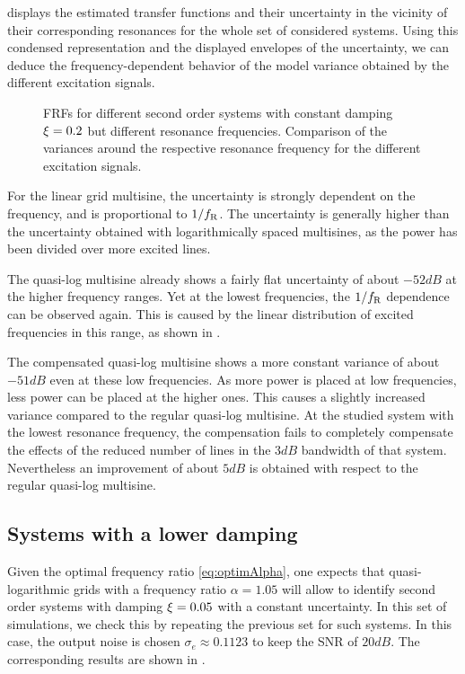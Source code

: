    displays the estimated transfer functions and their uncertainty in the vicinity of their corresponding resonances for the whole set of considered systems.
  Using this condensed representation and the displayed envelopes of the uncertainty, we can deduce the frequency-dependent behavior of the model variance obtained by the different excitation signals.

  \begin{figure}%
    \centering
      \setlength{}
      \setlength\figureheight{0.68\figurewidth}
    
    \caption[Simulated FRFs and their variances of systems with $\damping=0.2$ for different excitation signals.]{\glspl{FRF} for different second order systems with constant damping
             $\damping=0.2$ but different resonance frequencies. Comparison of the
             variances around the respective resonance frequency for the different
             excitation signals.}%
    \label{fig:damping02}
  \end{figure}

  For the linear grid multisine, the uncertainty is strongly dependent on the frequency, and is proportional to $1/f_{\mathrm{R}}$.
  The uncertainty is generally higher than the uncertainty obtained with logarithmically spaced multisines, as the power has been divided over more excited lines.

  The quasi-log multisine already shows a fairly flat uncertainty of about $-52 \unit{dB}$ at the higher frequency ranges.
  Yet at the lowest frequencies, the $1/f_{\mathrm{R}}$ dependence can be observed again.
  This is caused by the linear distribution of excited frequencies in this range, as shown in .

  The compensated quasi-log multisine shows a more constant variance of about $-51 \unit{dB}$ even at these low frequencies.
  As more power is placed at low frequencies, less power can be placed at the higher ones.
  This causes a slightly increased variance compared to the regular quasi-log multisine.
  At the studied system with the lowest resonance frequency, the compensation fails to completely compensate the effects of the reduced number of lines in the $3\unit{dB}$ bandwidth of that system.
  Nevertheless an improvement of about $5\unit{dB}$ is obtained with respect to the regular quasi-log multisine.

  \subsection{Systems with a lower damping}
  Given the optimal frequency ratio \eqref{eq:optimAlpha}, one expects that quasi-logarithmic grids with a frequency ratio $\alpha = 1.05$ will allow to identify second order systems with damping $\xi = 0.05$ with a constant uncertainty.
  In this set of simulations, we check this by repeating the previous set for such systems.
  In this case, the output noise is chosen $\sigma_e \approx 0.1123$ to keep the SNR of $20\unit{dB}$.
  The corresponding results are shown in .
 
